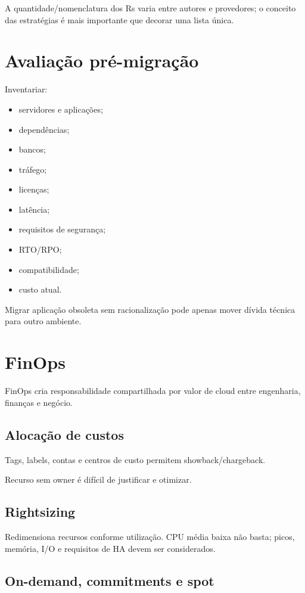 A quantidade/nomenclatura dos Rs varia entre autores e provedores; o conceito das estratégias é mais importante que decorar uma lista única.

\section{Avaliação pré-migração}

Inventariar:
\begin{itemize}
\item servidores e aplicações;
\item dependências;
\item bancos;
\item tráfego;
\item licenças;
\item latência;
\item requisitos de segurança;
\item RTO/RPO;
\item compatibilidade;
\item custo atual.
\end{itemize}

Migrar aplicação obsoleta sem racionalização pode apenas mover dívida técnica para outro ambiente.

\section{FinOps}

FinOps cria responsabilidade compartilhada por valor de cloud entre engenharia, finanças e negócio.

\subsection{Alocação de custos}

Tags, labels, contas e centros de custo permitem showback/chargeback.

Recurso sem owner é difícil de justificar e otimizar.

\subsection{Rightsizing}

Redimensiona recursos conforme utilização. CPU média baixa não basta; picos, memória, I/O e requisitos de HA devem ser considerados.

\subsection{On-demand, commitments e spot}

